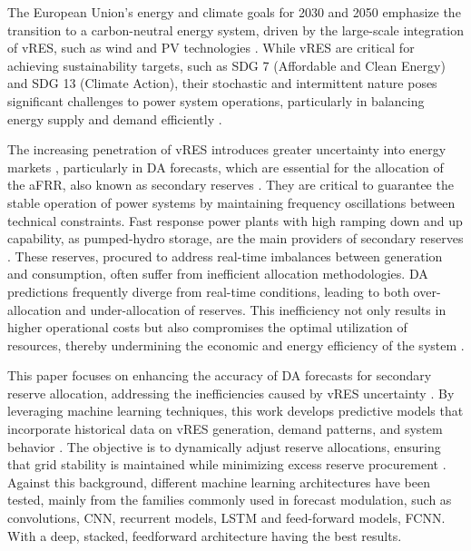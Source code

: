The European Union's energy and climate goals for 2030 and 2050 emphasize the transition to a carbon-neutral energy system, driven by the large-scale integration of \gls{vRES}, such as wind and \gls{PV} technologies \cite{Maris:21,Franc:21,Perissi2022,Dobrowolski:22}. While \gls{vRES} are critical for achieving sustainability targets, such as \gls{SDG} 7 (Affordable and Clean Energy) and \gls{SDG} 13 (Climate Action), their stochastic and intermittent nature poses significant challenges to power system operations, particularly in balancing energy supply and demand efficiently \cite{Ocker2017,Frade2019_wind,Prema:22}.  \par
The increasing penetration of \gls{vRES} introduces greater uncertainty into energy markets \cite{Shahidehpour:02,Kirschen:18}, particularly in \gls{DA} forecasts, which are essential for the allocation of the \gls{aFRR}, also known as secondary reserves \cite{Algarvio:19c,Skytte:19,Miettinen:19}. They are critical to guarantee the stable operation of power systems by maintaining frequency oscillations between technical constraints. Fast response power plants with high ramping down and up capability, as pumped-hydro storage, are the main providers of secondary reserves \cite{Martin:18,Algarvio:19a}. These reserves, procured to address real-time imbalances between generation and consumption, often suffer from inefficient allocation methodologies. \gls{DA} predictions frequently diverge from real-time conditions, leading to both over-allocation and under-allocation of reserves. This inefficiency not only results in higher operational costs but also compromises the optimal utilization of resources, thereby undermining the economic and energy efficiency of the system \cite{Algarvio:24,Frade:19c}.\par
This paper focuses on enhancing the accuracy of \gls{DA} forecasts for secondary reserve allocation, addressing the inefficiencies caused by \gls{vRES} uncertainty \cite{Prema:22,Algarvio:19a,Knorr:19}. By leveraging machine learning techniques, this work develops predictive models that incorporate historical data on \gls{vRES} generation, demand patterns, and system behavior \cite{DeVos2019,Kruse2022}. The objective is to dynamically adjust reserve allocations, ensuring that grid stability is maintained while minimizing excess reserve procurement \cite{Algarvio:24,Algarvio2024}. 
{Against this background, different machine learning architectures have been tested, mainly from the families commonly used in forecast modulation, such as convolutions, \gls{CNN}, recurrent models, \gls{LSTM} and feed-forward models, \gls{FCNN}. With a deep, stacked, feedforward architecture having the best results.}\par
